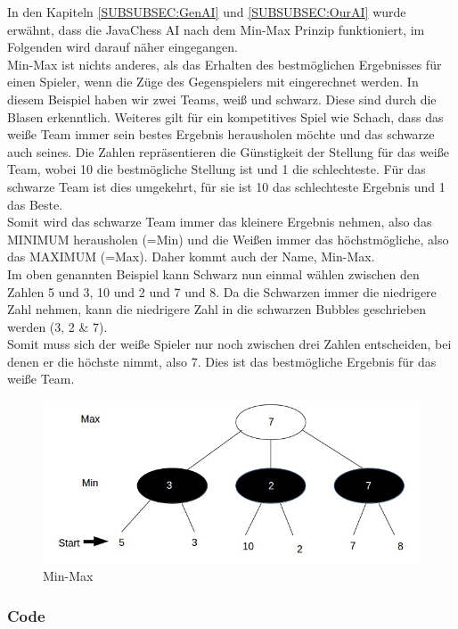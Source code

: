 \documentclass[12pt,a4paper]{article}
\begin{document}
In den Kapiteln \ref{SUBSUBSEC:GenAI} und \ref{SUBSUBSEC:OurAI} wurde erwähnt, dass die JavaChess AI nach dem Min-Max Prinzip funktioniert, im Folgenden wird darauf näher eingegangen.\\[2ex]
Min-Max ist nichts anderes, als das Erhalten des bestmöglichen Ergebnisses für einen Spieler, wenn die Züge des Gegenspielers mit eingerechnet werden. In diesem Beispiel haben wir zwei Teams, weiß und schwarz. Diese sind durch die Blasen erkenntlich. Weiteres gilt für ein kompetitives Spiel wie Schach, dass das weiße Team immer sein bestes Ergebnis herausholen möchte und das schwarze auch seines. Die Zahlen repräsentieren die Günstigkeit der Stellung für das weiße Team, wobei 10 die bestmögliche Stellung ist und 1 die schlechteste. Für das schwarze Team ist dies umgekehrt, für sie ist 10 das schlechteste Ergebnis und 1 das Beste. \\
Somit wird das schwarze Team immer das kleinere Ergebnis nehmen, also das MINIMUM herausholen (=Min) und die Weißen immer das höchstmögliche, also das MAXIMUM (=Max). Daher kommt  auch der Name, Min-Max. \\
Im oben genannten Beispiel kann Schwarz nun einmal wählen zwischen den Zahlen 5 und 3, 10 und 2 und 7 und 8. Da die Schwarzen immer die niedrigere Zahl nehmen, kann die niedrigere Zahl in die schwarzen Bubbles geschrieben werden (3, 2 \& 7). \\
Somit muss sich der weiße Spieler nur noch zwischen drei Zahlen entscheiden, bei denen er die höchste nimmt, also 7. Dies ist das bestmögliche Ergebnis für das weiße Team.
\begin{figure}[H]
  \centering
   	\includegraphics[width=16cm]{graphics/MinMax.jpg}
  \caption{Min-Max}
  \label{FIG:MINMAX}
\end{figure}

\newpage
\subsubsection{Code}
\label{SUBSUBSEC:AICODE}
\end{document}
